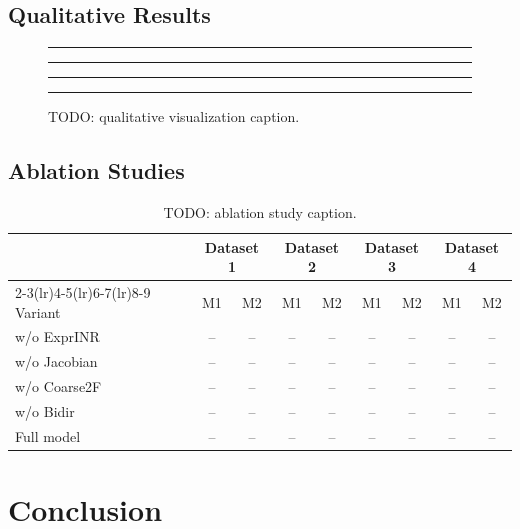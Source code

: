 \documentclass[runningheads]{llncs}
\begin{document}
\clearpage
\subsection{Qualitative Results}

\begin{figure}[t]
\centering
\rule{0.24\textwidth}{3cm}
\hfill
\rule{0.24\textwidth}{3cm}
\hfill
\rule{0.24\textwidth}{3cm}
\hfill
\rule{0.24\textwidth}{3cm}
\caption{TODO: qualitative visualization caption.}
\label{fig:qualitative}
\end{figure}


\clearpage
\subsection{Ablation Studies}

\begin{table}[t]
\centering
\caption{TODO: ablation study caption.}
\label{tab:ablation}
\setlength{\tabcolsep}{3.5pt}
{\fontsize{8}{9.5}\selectfont
\begin{tabular}{@{}l cc cc cc cc@{}}
\toprule
& \multicolumn{2}{c}{Dataset 1} & \multicolumn{2}{c}{Dataset 2} & \multicolumn{2}{c}{Dataset 3} & \multicolumn{2}{c}{Dataset 4} \\
\cmidrule(lr){2-3}\cmidrule(lr){4-5}\cmidrule(lr){6-7}\cmidrule(lr){8-9}
Variant & M1 & M2 & M1 & M2 & M1 & M2 & M1 & M2 \\
\midrule
w/o ExprINR   & -- & -- & -- & -- & -- & -- & -- & -- \\
w/o Jacobian  & -- & -- & -- & -- & -- & -- & -- & -- \\
w/o Coarse2F  & -- & -- & -- & -- & -- & -- & -- & -- \\
w/o Bidir     & -- & -- & -- & -- & -- & -- & -- & -- \\
Full model    & -- & -- & -- & -- & -- & -- & -- & -- \\
\bottomrule
\end{tabular}
}
\end{table}


\section{Conclusion}
\end{document}
